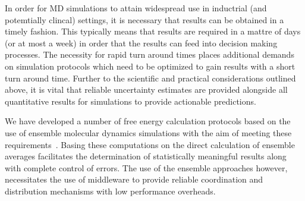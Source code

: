 In order for MD simulations to attain widespread use in inductrial (and potemtially 
clincal) settings, it is necessary that results can be obtained in a timely fashion.
This typically means that results are required in a mattre of days (or at most a week) 
in order that the results can feed into decision making processes.
The necessity for rapid turn around times places additional demands on
simulation protocols which need to be optimized to gain results with a short
turn around time. 
Further to the scientific and practical considerations
outlined above, it is vital that reliable uncertainty estimates are
provided alongside all quantitative results for simulations to provide
actionable predictions.

We have developed a number of free energy calculation protocols based on the
use of ensemble molecular dynamics simulations with the aim of meeting these
requirements~\cite{Sadiq2008, Sadiq2010, Wan2017brd4, Wan2017trk}. 
Basing these computations on the direct calculation of ensemble averages facilitates
the determination of statistically meaningful results along with complete
control of errors. 
The use of the ensemble approaches however, necessitates the use of middleware to 
provide reliable coordination and distribution mechanisms with low performance overheads.
